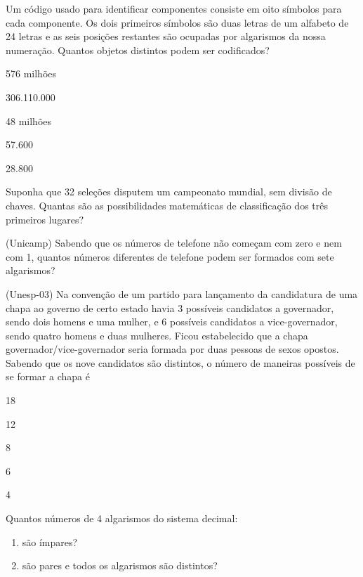 	\item Um código usado para identificar componentes consiste em oito símbolos para cada componente. Os dois primeiros símbolos são duas letras de um alfabeto de 24 letras e as seis posições restantes são ocupadas por algarismos da nossa numeração. Quantos objetos distintos podem ser codificados?
	\begin{enumerate}
	\end{enumerate}
	
	\item Suponha que 32 seleções disputem um campeonato mundial, sem divisão de chaves. Quantas são as possibilidades matemáticas de classificação dos três primeiros lugares?

	\item (Unicamp) Sabendo que os números de telefone não começam com zero e nem com 1, quantos números diferentes de telefone podem ser formados com sete algarismos?

	\item (Unesp-03) Na convenção de um partido para lançamento da candidatura de uma chapa ao governo de certo estado havia 3 possíveis candidatos a governador, sendo dois homens e uma mulher, e 6 possíveis candidatos a vice-governador, sendo quatro homens e duas mulheres. Ficou estabelecido que a chapa governador/vice-governador seria formada por duas pessoas de sexos opostos. Sabendo que os nove candidatos são distintos, o número de maneiras possíveis de se formar a chapa é
	\begin{enumerate}
		\begin{multicols}{5}
			\item 18
	  		\item 12
	  		\item 8
	  		\item 6
	  		\item 4
	  \end{multicols}
	\end{enumerate}
	
	\item Quantos números de 4 algarismos do sistema decimal:
	\begin{enumerate}		
			\item são ímpares?
	  		\item são pares e todos os algarismos são distintos?	  			
	\end{enumerate}
	
